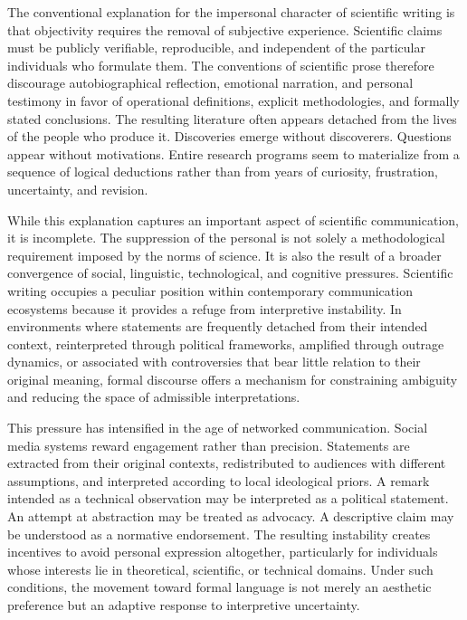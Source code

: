 \documentclass[11pt]{article}
\theoremstyle{plain}
\begin{document}
The conventional explanation for the impersonal character of scientific writing is that objectivity requires the removal of subjective experience. Scientific claims must be publicly verifiable, reproducible, and independent of the particular individuals who formulate them. The conventions of scientific prose therefore discourage autobiographical reflection, emotional narration, and personal testimony in favor of operational definitions, explicit methodologies, and formally stated conclusions. The resulting literature often appears detached from the lives of the people who produce it. Discoveries emerge without discoverers. Questions appear without motivations. Entire research programs seem to materialize from a sequence of logical deductions rather than from years of curiosity, frustration, uncertainty, and revision.

While this explanation captures an important aspect of scientific communication, it is incomplete. The suppression of the personal is not solely a methodological requirement imposed by the norms of science. It is also the result of a broader convergence of social, linguistic, technological, and cognitive pressures. Scientific writing occupies a peculiar position within contemporary communication ecosystems because it provides a refuge from interpretive instability. In environments where statements are frequently detached from their intended context, reinterpreted through political frameworks, amplified through outrage dynamics, or associated with controversies that bear little relation to their original meaning, formal discourse offers a mechanism for constraining ambiguity and reducing the space of admissible interpretations.

This pressure has intensified in the age of networked communication. Social media systems reward engagement rather than precision. Statements are extracted from their original contexts, redistributed to audiences with different assumptions, and interpreted according to local ideological priors. A remark intended as a technical observation may be interpreted as a political statement. An attempt at abstraction may be treated as advocacy. A descriptive claim may be understood as a normative endorsement. The resulting instability creates incentives to avoid personal expression altogether, particularly for individuals whose interests lie in theoretical, scientific, or technical domains. Under such conditions, the movement toward formal language is not merely an aesthetic preference but an adaptive response to interpretive uncertainty.
\end{document}
